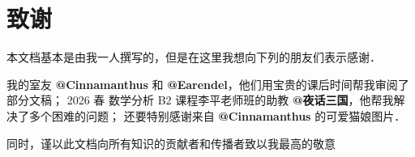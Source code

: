 \chapter{致谢}

本文档基本是由我一人撰写的，但是在这里我想向下列的朋友们表示感谢．

我的室友 \textbf{@Cinnamanthus} 和 \textbf{@Earendel}，他们用宝贵的课后时间帮我审阅了部分文稿；
2026 春 数学分析 B2 课程李平老师班的助教 \textbf{@夜话三国}，他帮我解决了多个困难的问题；
还要特别感谢来自 \textbf{@Cinnamanthus} 的可爱猫娘图片．

\bigskip

{\Large 同时，谨以此文档向所有知识的贡献者和传播者致以我最高的敬意}

\vspace{2em}
